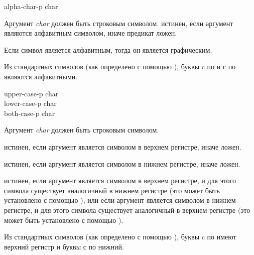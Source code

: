 \begin{defun}[Функция]
alpha-char-p char

Аргумент \emph{char} должен быть строковым символом.
 истинен, если аргумент являются алфавитным символом, иначе
предикат ложен.

Если символ является алфавитным, тогда он является графическим.

Из стандартных символов (как определено с помощью ), буквы
c  по  и с  по  являются алфавитными.
\end{defun}

\begin{defun}[Функция]
upper-case-p char \\
lower-case-p char \\
both-case-p char

Аргумент \emph{char} должен быть строковым символом.

 истинен, если аргумент является символом в верхнем регистре,
иначе ложен.

 истинен, если аргумент является символом в нижнем регистре,
иначе ложен.

 истинен, если аргумент является символом в верхнем регистре,
и для этого символа существует аналогичный в нижнем регистре (это может быть
установлено с помощью ), или если аргумент является символом
в нижнем регистре, 
и для этого символа существует аналогичный в верхнем регистре (это может быть
установлено с помощью ).

Из стандартных символов (как определено с помощью ), буквы
c  по  имеют верхний регистр и буквы с  по  нижний.
\end{defun}

